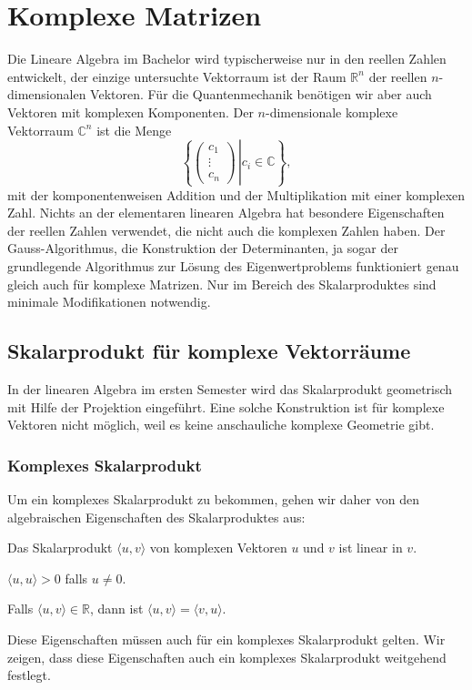 \section{Komplexe Matrizen}
%
Die Lineare Algebra im Bachelor wird typischerweise nur in den
reellen Zahlen entwickelt, der einzige untersuchte Vektorraum ist
der Raum $\mathbb R^n$ der reellen $n$-dimensionalen Vektoren.
Für die Quantenmechanik benötigen wir aber auch Vektoren mit
komplexen Komponenten. Der $n$-dimensionale komplexe Vektorraum
$\mathbb C^n$ ist die Menge
\[
\left\{\left.\begin{pmatrix}c_1\\\vdots\\c_n\end{pmatrix}\,\right|
c_i\in\mathbb C\right\},
\]
mit der komponentenweisen Addition und der Multiplikation mit einer
komplexen Zahl. Nichts an der elementaren linearen Algebra hat besondere
Eigenschaften der reellen Zahlen verwendet, die nicht auch die komplexen
Zahlen haben. Der Gauss-Algorithmus, die Konstruktion der Determinanten,
ja sogar der grundlegende Algorithmus zur Lösung des Eigenwertproblems
funktioniert genau gleich auch für komplexe Matrizen. Nur im Bereich
des Skalarproduktes sind minimale Modifikationen notwendig.

\subsection{Skalarprodukt für komplexe Vektorräume}
In der linearen Algebra im ersten Semester wird das Skalarprodukt
geometrisch mit Hilfe der Projektion eingeführt.
Eine solche Konstruktion ist für komplexe Vektoren nicht möglich,
weil es keine anschauliche komplexe Geometrie gibt.

\subsubsection{Komplexes Skalarprodukt}
Um ein komplexes Skalarprodukt zu bekommen, gehen wir daher von den
algebraischen Eigenschaften des Skalarproduktes aus:
\begin{compactenum}
\item Das Skalarprodukt $\langle u,v\rangle$ von komplexen Vektoren
$u$ und $v$ ist linear in $v$.
\item $\langle u,u\rangle > 0$ falls $u\ne 0$.
\item Falls $\langle u,v\rangle\in\mathbb R$, dann ist
$\langle u,v\rangle=\langle v,u\rangle$.
\end{compactenum}
Diese Eigenschaften müssen auch für ein komplexes Skalarprodukt gelten.
Wir zeigen, dass diese Eigenschaften auch ein komplexes Skalarprodukt 
weitgehend festlegt.

